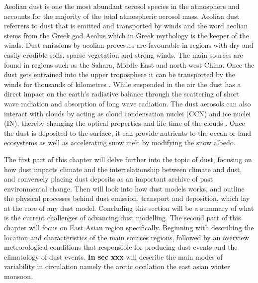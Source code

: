 
Aeolian dust is one the most abundant aerosol species in the atmosphere and accounts for the majority of the total atmospheric  aerosol mass. Aeolian dust referrers to dust that is emitted and transported by winds and the word aeolian stems from the Greek god Aeolus which in Greek mythology is the keeper of the winds.  Dust emissions by aeolian processes are favourable in regions with dry and easily erodible soils, sparse vegetation and strong winds. The main sources are found in regions such as the Sahara, Middle East and north west China. Once the dust gets entrained into the upper troposphere it can be transported by the winds for thousands of kilometres \parencite{yumimoto_elevated_2009}.
While suspended in the air the dust has a direct impact on the earth’s radiative balance through the scattering of short wave radiation and absorption of long wave radiation. The dust aerosols can also interact with clouds by acting as cloud condensation nuclei (CCN) and ice nuclei (IN), thereby changing the optical properties and life time of the clouds \parencite{lohmann2006sensitivity}. Once the dust is deposited to the surface, it can provide nutrients to the ocean \parencite{jickells_dust_biogeo_2015} or land ecosystems as well as accelerating snow melt by modifying the snow albedo. 

The first part of this chapter will delve further into the topic of dust, focusing on how dust impacts climate and the interrelationship between climate and dust, and conversely placing dust deposits as an important archive of past environmental change. Then  will look into how dust models works, and outline the physical processes behind dust emission, transport and deposition, which lay at the core of any dust model. Concluding this section will be a summary of what is the current challenges of advancing dust modelling. The second part of this chapter will focus on East Asian region specifically. Beginning with describing the location and characteristics of the main sources regions, followed by an overview meteorological conditions that responsible for producing dust events and the climatology of dust events. \textbf{In sec xxx} will describe the main modes of variability in circulation namely the arctic occilation the east asian winter monsoon. 


